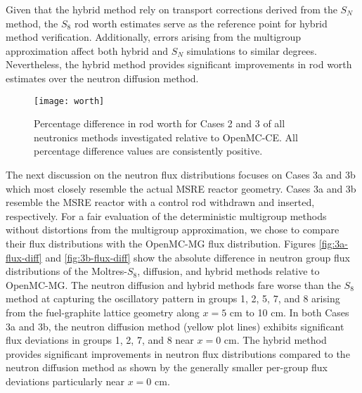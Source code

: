 Given that the hybrid method rely on transport corrections derived from the $S_N$ method, the
$S_8$ rod worth estimates serve as the
reference point for hybrid method verification. Additionally, errors arising from the multigroup
approximation affect both hybrid and $S_N$ simulations to similar degrees. Nevertheless, the hybrid
method provides significant improvements in rod worth estimates over the neutron diffusion method.

\begin{figure}[h]
  \centering
  \texttt{[image: worth]}
  \caption{Percentage difference in rod worth for Cases 2 and 3 of all neutronics methods
  investigated relative to OpenMC-CE. All percentage difference values are consistently positive.}
  \label{fig:1d-worth}
\end{figure}


The next discussion on the neutron flux distributions focuses on Cases 3a and 3b which most closely
resemble the actual \gls{MSRE} reactor geometry. Cases 3a and 3b resemble the \gls{MSRE} reactor
with a control rod withdrawn and inserted, respectively.
%
%
For a fair evaluation of the deterministic multigroup methods without distortions from the
multigroup approximation, we chose to compare their flux distributions with the OpenMC-MG flux
distribution. Figures \ref{fig:3a-flux-diff} and \ref{fig:3b-flux-diff} show the absolute
difference in neutron group flux distributions of the Moltres-$S_8$, diffusion, and
hybrid methods relative to OpenMC-MG.
The neutron diffusion and hybrid methods fare worse than the $S_8$ method at capturing the
oscillatory pattern in groups 1, 2, 5, 7, and 8 arising from the fuel-graphite lattice geometry
along $x=5$ cm to 10 cm. In both Cases 3a and 3b, the neutron diffusion method (yellow plot lines)
exhibits significant flux deviations in groups 1, 2, 7, and 8 near $x=0$ cm.
The hybrid method
provides significant improvements in neutron flux distributions compared to the neutron diffusion
method as shown by the generally smaller per-group flux deviations particularly near $x=0$ cm.

